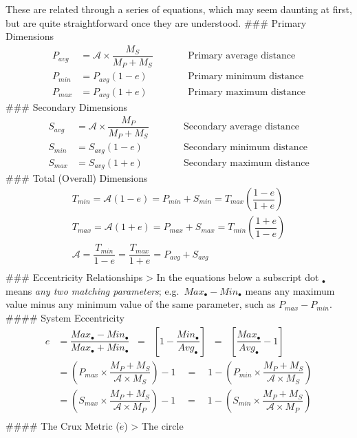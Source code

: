\documentclass[
  letterpaper,
]{book}
\begin{document}
These are related through a series of equations, which may seem daunting
at first, but are quite straightforward once they are understood. \#\#\#
Primary Dimensions \[
\begin{align}
P_{avg} &= \mathcal{A} \times\dfrac{M_S}{M_P+M_S} \qquad &&\text{Primary average distance}\\[1em]
P_{min} &= P_{avg}(1 - e) \qquad &&\text{Primary minimum distance} \\[1em]
P_{max} &= P_{avg}(1 + e) \qquad &&\text{Primary maximum distance} 
\end{align}
\] \#\#\# Secondary Dimensions \[
\begin{align}
S_{avg} &= \mathcal{A} \times\dfrac{M_P}{M_P+M_S} \qquad &&\text{Secondary average distance}\\[1em]
S_{min} &= S_{avg}(1 - e) \qquad &&\text{Secondary minimum distance} \\[1em]
S_{max} &= S_{avg}(1 + e) \qquad &&\text{Secondary maximum distance}
\end{align}
\] \#\#\# Total (Overall) Dimensions \[
\begin{gather}
T_{min} = \mathcal{A}(1 - e)
= P_{min} + S_{min} = T_{max}\left(\dfrac{1 - e}{1 + e}\right) \\
T_{max} = \mathcal{A}(1 + e)
= P_{max} + S_{max} = T_{min}\left(\dfrac{1 + e}{1 - e}\right) \\
\mathcal{A} = \dfrac{T_{min}}{1 - e}
= \dfrac{T_{max}}{1 + e}
= P_{avg} + S_{avg}\\[0.5em]
\end{gather}
\] \#\#\# Eccentricity Relationships \textgreater{} In the equations
below a subscript dot \(_{\bullet}\) means \emph{any two matching
parameters}; e.g.~\(Max_{\bullet} - Min_{\bullet}\) means any maximum
value minus any minimum value of the same parameter, such as
\(P_{max} - P_{min}\). \#\#\#\# System Eccentricity \[
\begin{align}
e &= \dfrac{Max_\bullet - Min_{\bullet}}{Max_\bullet + Min_{\bullet}}
\;\;=\;\; \left[1 - \dfrac{Min_{\bullet}}{Avg_{\bullet}}\right]
\;\;=\;\; \left[\dfrac{Max_{\bullet}}{Avg_{\bullet}} - 1\right] \\[1em]
&= \left(P_{max} \times \dfrac{M_P + M_S}{\mathcal{A} \times M_S}\right) - 1
\quad = \quad 1 - \left(P_{min} \times \dfrac{M_P + M_S}{\mathcal{A} \times M_S}\right) \\[1em]
&= \left(S_{max} \times \dfrac{M_P + M_S}{\mathcal{A} \times M_P}\right) - 1
\quad = \quad 1 - \left(S_{min} \times \dfrac{M_P + M_S}{\mathcal{A} \times M_P}\right) \\[1em]
\end{align}
\] \#\#\#\# The Crux Metric (\(\acute{e}\)) \textgreater{} The circle
\end{document}
